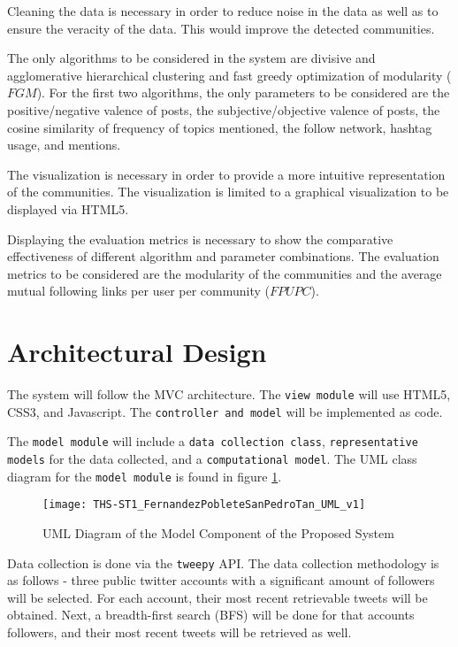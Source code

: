 Cleaning the data is necessary in order to reduce noise in the data as well as to ensure the veracity of the data. This 
would improve the detected communities.


The only algorithms to be considered in the system are divisive and agglomerative hierarchical clustering and fast greedy optimization
of modularity ($FGM$). For the first two algorithms, the only parameters to be considered are the positive/negative valence of posts, 
the subjective/objective valence of posts, the cosine similarity of frequency of topics mentioned, the follow network, hashtag usage,
and mentions.


The visualization is necessary in order to provide a more intuitive representation of the communities. The visualization is limited to 
a graphical visualization to be displayed via HTML5.


Displaying the evaluation metrics is necessary to show the comparative effectiveness of different algorithm and parameter combinations.
The evaluation metrics to be considered are the modularity of the communities and the average mutual following links per user per community
($FPUPC$).




\section{Architectural Design}
The system will follow the MVC architecture. The \texttt{view module} will use HTML5, CSS3, and Javascript. The 
\texttt{controller and model} will be implemented as code.


The \texttt{model module} will include a \texttt{data collection class}, \texttt{representative models} for the data collected, and a \texttt{computational model}.
The UML class diagram for the \texttt{model module} is found in figure \ref{fig:uml}.


\newpage


\begin{landscape}
	\begin{figure}
		\centering
		\texttt{[image: THS-ST1\_FernandezPobleteSanPedroTan\_UML\_v1]}
		\caption{UML Diagram of the Model Component of the Proposed System}
		\label{fig:uml}	
	\end{figure}
\end{landscape}


\newpage


Data collection is done via the \texttt{tweepy} API. The data collection methodology is as follows - three public twitter accounts with a significant amount of followers will be selected. For each account, their most recent retrievable tweets will be obtained. Next, a breadth-first search (BFS) will be done for that account\vtick s followers, and their most recent tweets will be retrieved as well. 




